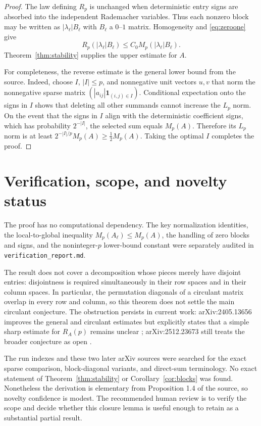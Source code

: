 \documentclass[11pt]{article}
\newcommand{\Rp}{R_p}
\newcommand{\Mp}{M_p}
\begin{document}
\begin{proof}
The law defining $\Rp$ is unchanged when deterministic entry signs are
absorbed into the independent Rademacher variables.  Thus each nonzero block
may be written as $|\lambda_\ell|B_\ell$ with $B_\ell$ a $0$--$1$ matrix.
Homogeneity and \eqref{eq:zeroone} give
\[
 \Rp(|\lambda_\ell|B_\ell)
 \leq C_0\Mp(|\lambda_\ell|B_\ell).
\]
Theorem~\ref{thm:stability} supplies the upper estimate for $A$.

For completeness, the reverse estimate is the general lower bound from the
source.  Indeed, choose $I$, $|I|\leq p$, and nonnegative unit vectors $u,v$
that norm the nonnegative sparse matrix
$(|a_{ij}|\mathbf1_{(i,j)\in I})$.  Conditional expectation onto the signs in
$I$ shows that deleting all other summands cannot increase the $L_p$ norm.
On the event that the signs in $I$ align with the deterministic coefficient
signs, which has probability $2^{-|I|}$, the selected sum equals
$\Mp(A)$.  Therefore its $L_p$ norm is at least
$2^{-|I|/p}\Mp(A)\geq\frac12\Mp(A)$.  Taking the optimal $I$ completes the
proof.
\end{proof}

\section{Verification, scope, and novelty status}

The proof has no computational dependency.  The key normalization identities,
the local-to-global inequality $\Mp(A_\ell)\leq\Mp(A)$, the handling of zero
blocks and signs, and the noninteger-$p$ lower-bound constant were separately
audited in \texttt{verification\_report.md}.

The result does not cover a decomposition whose pieces merely have disjoint
entries: disjointness is required simultaneously in their row spaces and in
their column spaces.  In particular, the permutation diagonals of a circulant
matrix overlap in every row and column, so this theorem does not settle the
main circulant conjecture.  The obstruction persists in current work:
arXiv:2405.13656 improves the general and circulant estimates but explicitly
states that a simple sharp estimate for $R_A(p)$ remains unclear
\cite{Latala2024}; arXiv:2512.23673 still treats the broader conjecture as open
\cite{Meller2025}.

The run indexes and these two later arXiv sources were searched for the exact
sparse comparison, block-diagonal variants, and direct-sum terminology.  No
exact statement of Theorem~\ref{thm:stability} or
Corollary~\ref{cor:blocks} was found.  Nonetheless the derivation is elementary
from Proposition 1.4 of the source, so novelty confidence is modest.  The
recommended human review is to verify the scope and decide whether this
closure lemma is useful enough to retain as a substantial partial result.
\end{document}
